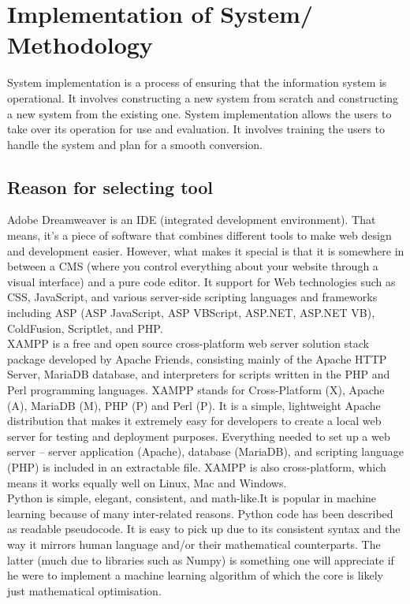 \chapter{Implementation of System/ Methodology}
System implementation is a process of ensuring that the information system is operational. It involves constructing a new system from scratch and constructing a new system from the existing one. System implementation allows the users to take over its operation for use and evaluation. It involves training the users to handle the system and plan for a smooth conversion.
\section{Reason for selecting tool}
Adobe Dreamweaver is an IDE (integrated development environment). That means, it’s a piece of software that combines different tools to make web design and development easier. However, what makes it special is that it is somewhere in between a CMS (where you control everything about your website through a visual interface) and a pure code editor. It support for Web technologies such as CSS, JavaScript, and various server-side scripting languages and frameworks including ASP (ASP JavaScript, ASP VBScript, ASP.NET, ASP.NET VB), ColdFusion, Scriptlet, and PHP.\\

XAMPP is a free and open source cross-platform web server solution stack package developed by Apache Friends, consisting mainly of the Apache HTTP Server, MariaDB database, and interpreters for scripts written in the PHP and Perl programming languages. XAMPP stands for Cross-Platform (X), Apache (A), MariaDB (M), PHP (P) and Perl (P). It is a simple, lightweight Apache distribution that makes it extremely easy for developers to create a local web server for testing and deployment purposes. Everything needed to set up a web server – server application (Apache), database (MariaDB), and scripting language (PHP) is included in an extractable file. XAMPP is also cross-platform, which means it works equally well on Linux, Mac and Windows.\\

Python is simple, elegant, consistent, and math-like.It is popular in machine learning because of many inter-related reasons. Python code has been described as readable pseudocode. It is easy to pick up due to its consistent syntax and the way it mirrors human language and/or their mathematical counterparts. The latter (much due to libraries such as Numpy) is something one will appreciate if he were to implement a machine learning algorithm of which the core is likely just mathematical optimisation.
